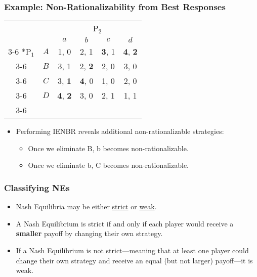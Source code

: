 \begin{frame}
\frametitle{Example: Non-Rationalizability from Best Responses}
\begin{table}[h]
	\centering
	\begin{tabular}{cc|c|c|c|c|}
		& \multicolumn{1}{c}{} & \multicolumn{4}{c}{P$_2$}\\
		& \multicolumn{1}{c}{} & \multicolumn{1}{c}{$a$} & \multicolumn{1}{c}{$b$} & \multicolumn{1}{c}{$c$} & \multicolumn{1}{c}{$d$} \\\cline{3-6}
		\multirow{4}*{P$_1$}  & $A$ & 1, 0 & 2, 1 & \textbf{3}, 1 & \textbf{4}, \textbf{2} \\\cline{3-6}
		& $B$ & 3, 1 & 2, \textbf{2} & 2, 0 & 3, 0 \\\cline{3-6}
		& $C$ & 3, \textbf{1} & \textbf{4}, 0 & 1, 0 & 2, 0 \\\cline{3-6}
		& $D$ & \textbf{4}, \textbf{2} & 3, 0 & 2, 1 & 1, 1 \\\cline{3-6}
	\end{tabular}
\end{table}
\begin{itemize}
	\item Performing IENBR reveals additional non-rationalizable strategies:
	\begin{itemize}
		\item Once we eliminate B, b becomes non-rationalizable.
		\item Once we eliminate b, C becomes non-rationalizable.
	\end{itemize}
\end{itemize}
\end{frame}



\begin{frame}
\frametitle{Classifying NEs}
\begin{itemize}
	\item Nash Equilibria may be either \underline{strict} or \underline{weak}.
	\item A Nash Equilibrium is strict if and only if each player would receive a \textbf{smaller} payoff by changing their own strategy.
	\item If a Nash Equilibrium is not strict---meaning that at least one player could change their own strategy and receive an equal (but not larger) payoff---it is weak.
\end{itemize}
\end{frame}

